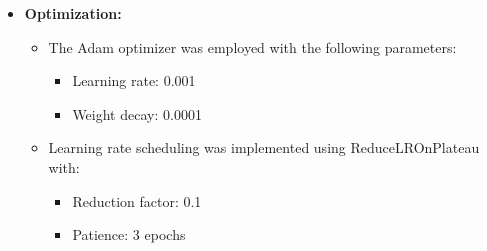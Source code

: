\begin{itemize}
\begin{itemize}
                  \item \textbf{Optimization:}
                  \begin{itemize}
                        \item The Adam optimizer was employed with the following parameters:
                              \begin{itemize}
                                    \item Learning rate: 0.001
                                    \item Weight decay: 0.0001
                              \end{itemize}
                        \item Learning rate scheduling was implemented using ReduceLROnPlateau with:
                              \begin{itemize}
                                    \item Reduction factor: 0.1
                                    \item Patience: 3 epochs
                              \end{itemize}
                  \end{itemize}


\end{itemize}
\end{itemize}
